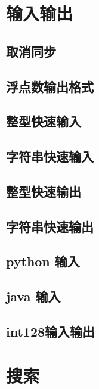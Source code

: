 \chapter{输入输出}
\section{取消同步}
\raggedbottom
\hrulefill
\section{浮点数输出格式}
\raggedbottom
\hrulefill
\section{整型快速输入}
\raggedbottom
\hrulefill
\section{字符串快速输入}
\raggedbottom
\hrulefill
\section{整型快速输出}
\raggedbottom
\hrulefill
\section{字符串快速输出}
\raggedbottom
\hrulefill
\section{python 输入}
\raggedbottom
\hrulefill
\section{java 输入}
\raggedbottom
\hrulefill
\section{int128输入输出}
\raggedbottom
\hrulefill

\chapter{搜索}

